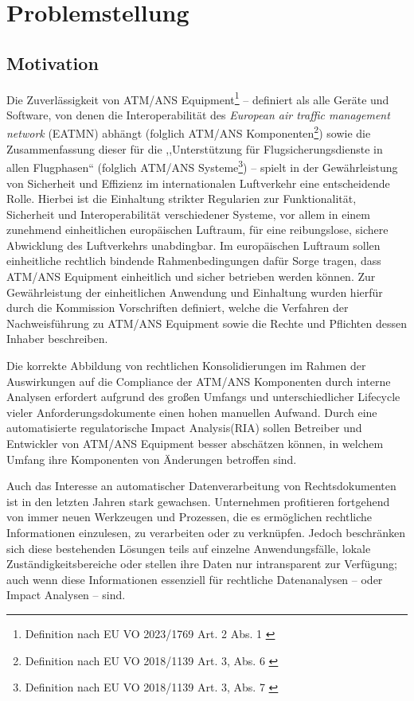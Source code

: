 \chapter{Problemstellung}
    \section{Motivation}

        Die Zuverlässigkeit von ATM/ANS Equipment\footnote{Definition nach EU VO 2023/1769 Art. 2 Abs. 1 \cite{2023R1769}}  -- definiert als alle Geräte und Software, von denen die Interoperabilität des \textit{European air traffic management network} (EATMN) abhängt (folglich ATM/ANS Komponenten\footnote{Definition nach EU VO 2018/1139 Art. 3, Abs. 6 \cite{2018R1139}})  sowie die Zusammenfassung dieser für die ,,Unterstützung für Flugsicherungsdienste in allen Flugphasen`` (folglich ATM/ANS Systeme\footnote{Definition nach EU VO 2018/1139 Art. 3, Abs. 7 \cite{2018R1139}}) -- spielt in der Gewährleistung von Sicherheit und Effizienz im internationalen Luftverkehr eine entscheidende Rolle. 
        Hierbei ist die Einhaltung strikter Regularien zur Funktionalität, Sicherheit und Interoperabilität verschiedener Systeme, vor allem in einem zunehmend einheitlichen europäischen Luftraum, für eine reibungslose, sichere Abwicklung des Luftverkehrs unabdingbar. 
        Im europäischen Luftraum sollen einheitliche rechtlich bindende Rahmenbedingungen dafür Sorge tragen, dass ATM/ANS Equipment einheitlich und sicher betrieben werden können.
        Zur Gewährleistung der einheitlichen Anwendung und Einhaltung wurden hierfür durch die Kommission Vorschriften definiert, welche die Verfahren der Nachweisführung zu ATM/ANS Equipment sowie die Rechte und Pflichten dessen Inhaber beschreiben. \cite[Art. 43 Abs. 1]{2018R1139} 
        
    
        Die korrekte Abbildung von rechtlichen Konsolidierungen im Rahmen der Auswirkungen auf die Compliance der ATM/ANS Komponenten durch interne Analysen erfordert aufgrund des großen Umfangs und unterschiedlicher Lifecycle vieler Anforderungsdokumente einen hohen manuellen Aufwand.
        Durch eine automatisierte regulatorische Impact Analysis(RIA) sollen Betreiber und Entwickler von ATM/ANS Equipment besser abschätzen können, in welchem Umfang ihre Komponenten von Änderungen betroffen sind. 


    Auch das Interesse an automatischer Datenverarbeitung von Rechtsdokumenten ist in den letzten Jahren stark gewachsen.
    Unternehmen profitieren fortgehend von immer neuen Werkzeugen und Prozessen, die es ermöglichen rechtliche Informationen einzulesen, zu verarbeiten oder zu verknüpfen.
    Jedoch beschränken sich diese bestehenden Lösungen teils auf einzelne Anwendungsfälle, lokale Zuständigkeitsbereiche oder stellen ihre Daten nur intransparent zur Verfügung\cite[385]{eu_open_legal_info}; auch wenn diese Informationen essenziell für rechtliche Datenanalysen -- oder Impact Analysen -- sind.
    
